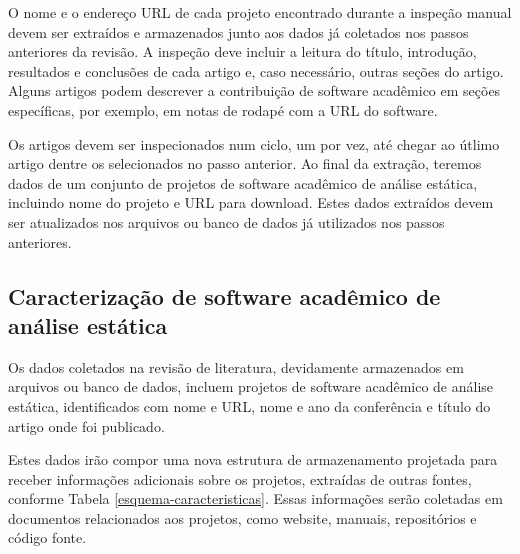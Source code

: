 \begin{description}
O nome e o endereço URL de cada projeto encontrado durante a inspeção manual
devem ser extraídos e armazenados junto aos dados já coletados nos passos
anteriores da revisão. A inspeção deve incluir a leitura do título, introdução,
resultados e conclusões de cada artigo e, caso necessário, outras
seções do artigo. Alguns artigos podem descrever a contribuição de software acadêmico
em seções específicas, por exemplo, em
notas de rodapé com a URL do software.

Os artigos devem ser inspecionados num ciclo, um por vez, até chegar ao útlimo
artigo dentre os selecionados no passo anterior. Ao final da extração, teremos
dados de um conjunto de projetos de software acadêmico de análise estática,
incluindo nome do projeto e URL para download. Estes dados extraídos devem ser
atualizados nos arquivos ou banco de dados já utilizados nos passos anteriores.

\end{description}

\subsection{Caracterização de software acadêmico de análise estática}

Os dados coletados na revisão de literatura, devidamente armazenados em
arquivos ou banco de dados, incluem projetos de software acadêmico de análise
estática, identificados com nome e URL, nome e ano da conferência e
título do artigo onde foi publicado.

Estes dados irão compor uma nova estrutura de armazenamento
projetada para receber informações adicionais sobre os projetos, 
extraídas de outras fontes, conforme Tabela
\ref{esquema-caracteristicas}. Essas informações serão coletadas em documentos
relacionados aos projetos, como website, manuais, repositórios e código fonte.

